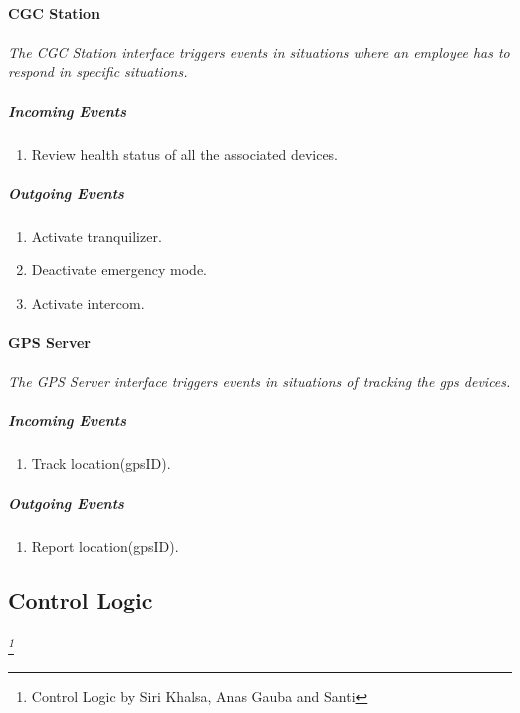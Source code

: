 \documentclass[12pt]{article}
\begin{document}
	\paragraph{CGC Station}
	\paragraph{}\textit{The CGC Station interface triggers events in situations where an employee has to respond in specific situations. }
	    \subparagraph{Incoming Events}
		\begin{enumerate}
			\item Review health status of all the associated devices.
		\end{enumerate}
				
	    \subparagraph{Outgoing Events}
		\begin{enumerate}
			\item Activate tranquilizer.
			\item Deactivate emergency mode.
			\item Activate intercom. 
		\end{enumerate}

	\paragraph{GPS Server}
	\paragraph{}\textit{The GPS Server interface triggers events in situations of tracking the gps devices. }
	    \subparagraph{Incoming Events}
		\begin{enumerate}
			\item Track location(gpsID).
		\end{enumerate}
				
	    \subparagraph{Outgoing Events}
		\begin{enumerate}
			\item Report location(gpsID).
		\end{enumerate}						
		
    \subsection{Control Logic} \label{logic}%
	\paragraph{} \textit{ \footnote{Control Logic by Siri Khalsa, Anas Gauba and Santi}}
\end{document}
